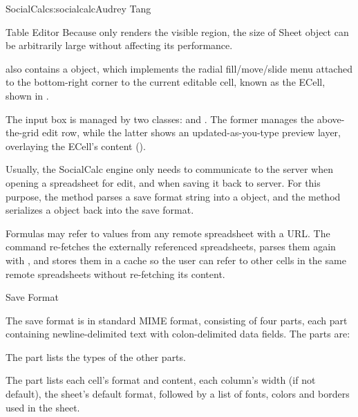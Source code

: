 \begin{aosachapter}{SocialCalc}{s:socialcalc}{Audrey Tang}
\begin{aosasect1}{Table Editor}
Because  only renders the visible region, the size
of Sheet object can be arbitrarily large without affecting its
performance.

 also contains a  object, which
implements the radial fill/move/slide menu attached to the
bottom-right corner to the current editable cell, known as the ECell,
shown in .


The input box is managed by two classes:  and
.  The former manages the above-the-grid edit row,
while the latter shows an updated-as-you-type preview layer,
overlaying the ECell's content ().


Usually, the SocialCalc engine only needs to communicate to the server
when opening a spreadsheet for edit, and when saving it back to
server.  For this purpose, the  method
parses a save format string into a  object, and the
 method serializes a  object
back into the save format.

Formulas may refer to values from any remote spreadsheet with a URL.
The  command re-fetches the externally referenced
spreadsheets, parses them again with , and
stores them in a cache so the user can refer to other cells in the
same remote spreadsheets without re-fetching its content.

\end{aosasect1}

\begin{aosasect1}{Save Format}

The save format is in standard MIME  format,
consisting of four  parts, each part
containing newline-delimited text with colon-delimited data fields.
The parts are:

\begin{aosaitemize}

  \item The  part lists the types of the other parts.

  \item The  part lists each cell's format and content, each
  column's width (if not default), the sheet's default format, followed
  by a list of fonts, colors and borders used in the sheet.


\end{aosaitemize}
\end{aosasect1}
\end{aosachapter}
